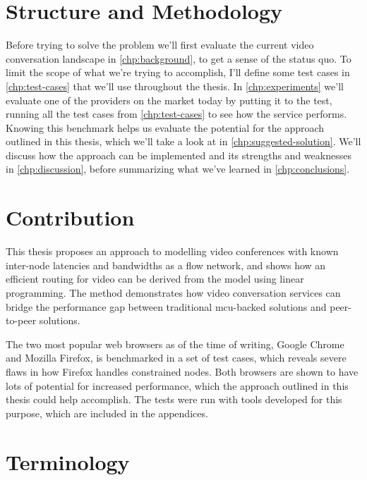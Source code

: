 \section{Structure and Methodology}

Before trying to solve the problem we'll first evaluate the current video conversation landscape in \autoref{chp:background}, to get a sense of the status quo. To limit the scope of what we're trying to accomplish, I'll define some test cases in \autoref{chp:test-cases} that we'll use throughout the thesis. In \autoref{chp:experiments} we'll evaluate one of the providers on the market today by putting it to the test, running all the test cases from \autoref{chp:test-cases} to see how the service performs. Knowing this benchmark helps us evaluate the potential for the approach outlined in this thesis, which we'll take a look at in \autoref{chp:suggested-solution}. We'll discuss how the approach can be implemented and its strengths and weaknesses in \autoref{chp:discussion}, before summarizing what we've learned in \autoref{chp:conclusions}.


\section{Contribution}

This thesis proposes an approach to modelling video conferences with known inter-node latencies and bandwidths as a flow network, and shows how an efficient routing for video can be derived from the model using linear programming. The method demonstrates how video conversation services can bridge the performance gap between traditional \gls{mcu}-backed solutions and peer-to-peer solutions.

The two most popular web browsers as of the time of writing, Google Chrome and Mozilla Firefox, is benchmarked in a set of test cases, which reveals severe flaws in how Firefox handles constrained nodes. Both browsers are shown to have lots of potential for increased performance, which the approach outlined in this thesis could help accomplish. The tests were run with tools developed for this purpose, which are included in the appendices.


\section{Terminology}

